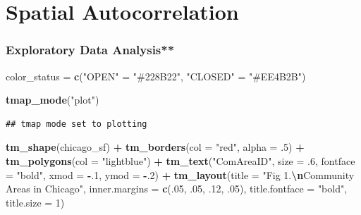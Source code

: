 \documentclass[
]{article}
\newenvironment{Shaded}{\begin{snugshade}}{\end{snugshade}}
\newcommand{\AttributeTok}[1]{\textcolor[rgb]{0.13,0.29,0.53}{#1}}
\newcommand{\DecValTok}[1]{\textcolor[rgb]{0.00,0.00,0.81}{#1}}
\newcommand{\FunctionTok}[1]{\textcolor[rgb]{0.13,0.29,0.53}{\textbf{#1}}}
\newcommand{\NormalTok}[1]{#1}
\newcommand{\OtherTok}[1]{\textcolor[rgb]{0.56,0.35,0.01}{#1}}
\newcommand{\SpecialCharTok}[1]{\textcolor[rgb]{0.81,0.36,0.00}{\textbf{#1}}}
\newcommand{\StringTok}[1]{\textcolor[rgb]{0.31,0.60,0.02}{#1}}
\begin{document}
\hypertarget{spatial-autocorrelation}{%
\section{Spatial Autocorrelation}\label{spatial-autocorrelation}}

\hypertarget{exploratory-data-analysis}{%
\subsubsection{Exploratory Data
Analysis**}\label{exploratory-data-analysis}}

\begin{Shaded}
\begin{Highlighting}[]
\NormalTok{color\_status }\OtherTok{=} \FunctionTok{c}\NormalTok{(}\StringTok{"OPEN"} \OtherTok{=} \StringTok{"\#228B22"}\NormalTok{,}
                 \StringTok{"CLOSED"} \OtherTok{=} \StringTok{"\#EE4B2B"}\NormalTok{)}

\FunctionTok{tmap\_mode}\NormalTok{(}\StringTok{"plot"}\NormalTok{)}
\end{Highlighting}
\end{Shaded}

\begin{verbatim}
## tmap mode set to plotting
\end{verbatim}

\begin{Shaded}
\begin{Highlighting}[]
\FunctionTok{tm\_shape}\NormalTok{(chicago\_sf) }\SpecialCharTok{+}
  \FunctionTok{tm\_borders}\NormalTok{(}\AttributeTok{col =} \StringTok{"red"}\NormalTok{, }\AttributeTok{alpha =}\NormalTok{ .}\DecValTok{5}\NormalTok{) }\SpecialCharTok{+}
  \FunctionTok{tm\_polygons}\NormalTok{(}\AttributeTok{col =} \StringTok{"lightblue"}\NormalTok{) }\SpecialCharTok{+}
  \FunctionTok{tm\_text}\NormalTok{(}\StringTok{"ComAreaID"}\NormalTok{, }
          \AttributeTok{size =}\NormalTok{ .}\DecValTok{6}\NormalTok{,}
          \AttributeTok{fontface =} \StringTok{"bold"}\NormalTok{,}
          \AttributeTok{xmod =} \SpecialCharTok{{-}}\NormalTok{.}\DecValTok{1}\NormalTok{,}
          \AttributeTok{ymod =} \SpecialCharTok{{-}}\NormalTok{.}\DecValTok{2}\NormalTok{) }\SpecialCharTok{+}
  \FunctionTok{tm\_layout}\NormalTok{(}\AttributeTok{title =} \StringTok{"Fig 1.}\SpecialCharTok{\textbackslash{}n}\StringTok{Community Areas in Chicago"}\NormalTok{,}
            \AttributeTok{inner.margins =} \FunctionTok{c}\NormalTok{(.}\DecValTok{05}\NormalTok{, .}\DecValTok{05}\NormalTok{, .}\DecValTok{12}\NormalTok{, .}\DecValTok{05}\NormalTok{),}
            \AttributeTok{title.fontface =} \StringTok{"bold"}\NormalTok{,}
            \AttributeTok{title.size =} \DecValTok{1}\NormalTok{)}
\end{Highlighting}
\end{Shaded}
\end{document}
